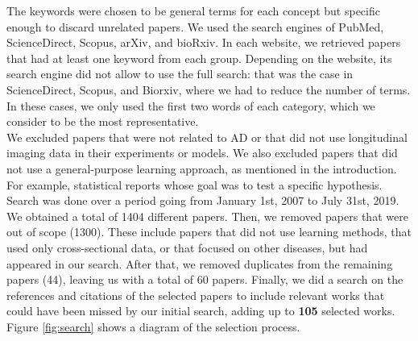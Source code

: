 The keywords were chosen to be general terms for each concept but specific enough to discard unrelated papers. We used the search engines of PubMed, ScienceDirect, Scopus, arXiv, and bioRxiv. In each website, we retrieved papers that had at least one keyword from each group. Depending on the website, its search engine did not allow to use the full search: that was the case in ScienceDirect, Scopus, and Biorxiv, where we had to reduce the number of terms. In these cases, we only used the first two words of each category, which we consider to be the most representative. \\

We excluded papers that were not related to AD or that did not use longitudinal imaging data in their experiments or models. We also excluded papers that did not use a general-purpose learning approach, as mentioned in the introduction. For example, statistical reports whose goal was to test a specific hypothesis. \\

Search was done over a period going from January 1st, 2007 to July 31st, 2019. We obtained a total of 1404 different papers. Then, we removed papers that were out of scope (1300). These include papers that did not use learning methods, that used only cross-sectional data, or that focused on other diseases, but had appeared in our search. After that, we removed duplicates from the remaining papers (44), leaving us with a total of 60 papers. Finally, we did a search on the references and citations of the selected papers to include relevant works that could have been missed by our initial search, adding up to \textbf{105} selected works. Figure \ref{fig:search} shows a diagram of the selection process.

